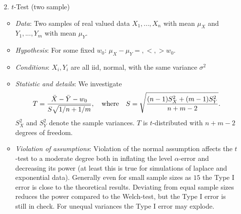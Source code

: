 \documentclass[12pt,a4paper]{amsart}
\theoremstyle{definition}
\theoremstyle{remark}
\numberwithin{equation}{section}
\begin{document}
\begin{itemize}
\item[2.] $t$-Test (two sample)
\begin{itemize}
\item \textit{Data}:  Two samples of real valued data $X_1,...,X_n$ with mean $\mu_X$ and $Y_1,...,Y_m$ with mean $\mu_Y$.
\item \textit{Hypothesis}: For some fixed $w_0$: $\mu_X-\mu_Y=,<,>w_0$. 
\item \textit{Conditions}: $X_i, Y_i$ are all iid, normal, with the same variance $\sigma^2$
\item \textit{Statistic and details}: We investigate
$$T= \frac{\bar{X}-\bar{Y}-w_0}{S\sqrt{1/n+1/m}}, \quad \textnormal{where} \quad S=\sqrt{\frac{(n-1)S_X^2+(m-1)S_Y^2}{n+m-2}}.$$
$S_X^2$ and $S_Y^2$ denote the sample variances. $T$ is $t$-distributed with $n+m-2$ degrees of freedom.
\item \textit{Violation of assumptions}:
Violation of the normal assumption affects the $t$-test to a moderate degree both in inflating the level $\alpha$-error and
decreasing its power (at least this is true for simulations of laplace and exponential data). Generally even for small sample
sizes as $15$ the Type I error is close to the theoretical results. Deviating from equal sample sizes reduces the power 
compared to the Welch-test, but the Type I error is still in check. For unequal variances the Type I error may explode. \\
\end{itemize}


\end{itemize}
\end{document}
